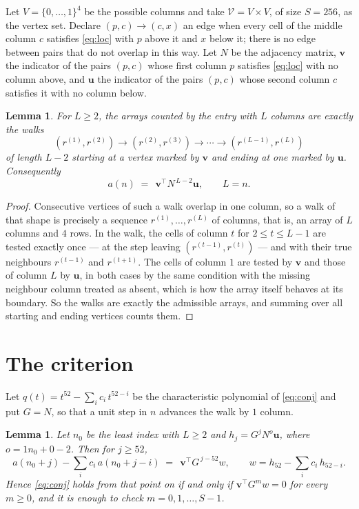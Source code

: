 \documentclass[11pt,a4paper]{article}
\theoremstyle{plain}
\newtheorem{lemma}[theorem]{Lemma}
\theoremstyle{definition}
\begin{document}
Let $V=\{0,\dots,1\}^{4}$ be the possible columns and take
$\mathcal V=V\times V$, of size $S=256$, as the vertex set. Declare $(p,c)\to(c,x)$ an edge
when every cell of the middle column $c$ satisfies \eqref{eq:loc} with $p$ above it and $x$
below it; there is no edge between pairs that do not overlap in this way. Let $N$ be the
adjacency matrix, $\mathbf{v}$ the indicator of the pairs $(p,c)$ whose first column $p$
satisfies \eqref{eq:loc} with no column above, and $\mathbf{u}$ the indicator of
the pairs $(p,c)$ whose second column $c$ satisfies it with no column below.

\begin{lemma}\label{lem:walk}
For $L\ge2$, the arrays counted by the entry with $L$ columns are exactly the walks
\[
(r^{(1)},r^{(2)})\to(r^{(2)},r^{(3)})\to\cdots\to(r^{(L-1)},r^{(L)})
\]
of length $L-2$ starting at a vertex marked by $\mathbf{v}$ and ending at one marked by
$\mathbf{u}$. Consequently
\[
a(n)\;=\;\,\mathbf{v}^{\!\top}N^{\,L-2}\mathbf{u},\qquad L=n .
\]
\end{lemma}

\begin{proof}
Consecutive vertices of such a walk overlap in one column, so a walk of that shape is
precisely a sequence $r^{(1)},\dots,r^{(L)}$ of columns, that is, an array of $L$ columns
and $4$ rows. In the walk, the cells of column $t$ for $2\le t\le L-1$ are tested
exactly once --- at the step leaving $(r^{(t-1)},r^{(t)})$ --- and with their true
neighbours $r^{(t-1)}$ and $r^{(t+1)}$. The cells of column $1$ are tested by
$\mathbf{v}$ and those of column $L$ by $\mathbf{u}$, in both cases by the same condition
with the missing neighbour column treated as absent, which is how the array itself behaves at
its boundary. So the walks are exactly the admissible arrays, and summing over all starting
and ending vertices counts them.
\end{proof}

\section{The criterion}

Let $q(t)=t^{52}-\sum_i c_i\,t^{52-i}$ be the characteristic polynomial of
\eqref{eq:conj} and put $G=N$, so that a unit step in $n$ advances the walk by
$1$ column.

\begin{lemma}\label{lem:crit}
Let $n_0$ be the least index with $L\ge2$ and $h_j=G^{j}N^{o}\mathbf{u}$, where
$o=1n_0+0-2$. Then for $j\ge52$,
\[
a(n_0+j)-\sum_i c_i\,a(n_0+j-i)\;=\;\,\mathbf{v}^{\!\top}G^{\,j-52}w,
\qquad w=h_{52}-\sum_i c_i\,h_{52-i} .
\]
Hence \eqref{eq:conj} holds from that point on if and only if
$\mathbf{v}^{\!\top}G^{m}w=0$ for every $m\ge0$, and it is enough to check
$m=0,1,\dots,S-1$.
\end{lemma}
\end{document}
